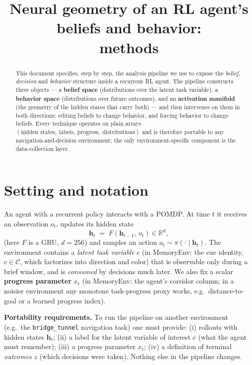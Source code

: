 \documentclass[11pt]{article}
\title{\textbf{Neural geometry of an RL agent's beliefs and behavior:\\ methods}}
\author{}
\date{}
\newcommand{\h}{\bm{h}}
\newcommand{\R}{\mathbb{R}}
\begin{document}
\maketitle
\vspace{-3em}

\begin{abstract}
\noindent
This document specifies, step by step, the analysis pipeline we use to expose
the \emph{belief}, \emph{decision} and \emph{behavior} structure inside a
recurrent RL agent. The pipeline constructs three objects --- a \textbf{belief
space} (distributions over the latent task variable), a \textbf{behavior space}
(distributions over future outcomes), and an \textbf{activation manifold} (the
geometry of the hidden states that carry both) --- and then intervenes on them
in both directions: editing beliefs to change behavior, and forcing behavior to
change beliefs. Every technique operates on plain arrays
$(\text{hidden states},\ \text{labels},\ \text{progress},\ \text{distributions})$
and is therefore portable to any navigation-and-decision environment; the only
environment-specific component is the data-collection layer.
\end{abstract}

\section{Setting and notation}

An agent with a recurrent policy interacts with a POMDP. At time $t$ it
receives an observation $o_t$, updates its hidden state
\begin{equation}
  \h_t \;=\; F(\h_{t-1},\, o_t) \in \R^{d},
\end{equation}
(here $F$ is a GRU, $d{=}256$) and samples an action $a_t \sim \pi(\cdot \mid
\h_t)$. The environment contains a \emph{latent task variable} $c$ (in
MemoryEnv: the cue identity, $c \in \mathcal{C}$, which factorizes into
direction and color) that is observable only during a brief window, and is
\emph{consumed} by decisions much later. We also fix a scalar \textbf{progress
parameter} $x_t$ (in MemoryEnv: the agent's corridor column; in a noisier
environment any monotone task-progress proxy works, e.g.\ distance-to-goal or
a learned progress index).

\begin{tcolorbox}
\textbf{Portability requirements.} To run the pipeline on another environment
(e.g.\ the \texttt{bridge\_tunnel} navigation task) one must provide:
(i) rollouts with hidden states $\h_t$;
(ii) a label for the latent variable of interest $c$ (what the agent must
remember);
(iii) a progress parameter $x_t$;
(iv) a definition of terminal \emph{outcomes} $z$ (which decisions were taken).
Nothing else in the pipeline changes.
\end{tcolorbox}
\end{document}

